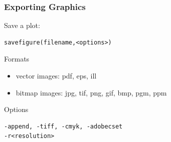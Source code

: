 \begin{frame}[fragile]
  \frametitle{Exporting Graphics}
    Save a plot:
\begin{lstlisting}
savefigure(filename,<options>)
\end{lstlisting}

    \begin{block}{Formats}
      \begin{itemize}
      \item vector images: pdf, eps, ill
      \item bitmap images: jpg, tif, png, gif, bmp, pgm, ppm
      \end{itemize}

    \end{block}

    \begin{block}{Options}
\begin{lstlisting}
-append, -tiff, -cmyk, -adobecset
-r<resolution>
\end{lstlisting}
    \end{block}
\end{frame}


